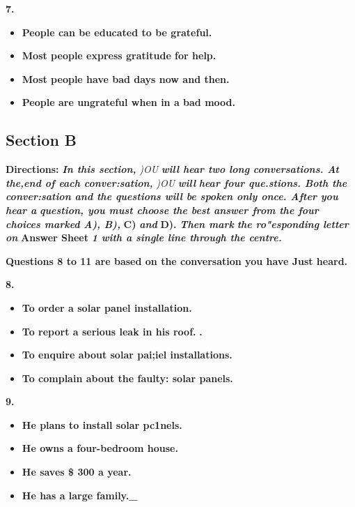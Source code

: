 \documentclass[UTF8,11pt]{ctexart}
\begin{document}
\textbf{7.}


\begin{itemize}[leftmargin=2em,itemsep=.2em,topsep=.4em]\item[A.] \textbf{People can be educated to be grateful.}
\item[B.] \textbf{Most people express gratitude for help.}
\item[C.] \textbf{Most people have bad days now and then.}
\item[D.] \textbf{People are ungrateful when in a bad mood.}
\end{itemize}

\subsection*{\textbf{Section B}}


\textbf{Directions: }\textbf{\textit{In this section, }}\textit{)OU }\textbf{\textit{will hear two long conversations. At the,end of each conver:sation, }}\textit{)OU }\textbf{\textit{will}} \textbf{\textit{hear four que.stions. Both the conver:sation and the questions will be spoken only once. After you hear a}} \textbf{\textit{question, you must choose the best answer from the four choices marked A), B), }}\textbf{C) }\textbf{\textit{and }}\textbf{D). }\textbf{\textit{Then mark}} \textbf{\textit{the ro"esponding letter on }}\textbf{Answer Sheet }\textbf{\textit{1 with a single line through the centre.}}


\textbf{Questions 8 to 11 are based on the conversation you have Just heard.}


\textbf{8.}


\begin{itemize}[leftmargin=2em,itemsep=.2em,topsep=.4em]\item[A.] \textbf{To order a solar panel installation.}
\item[B.] \textbf{To report a serious leak in his roof.} \textbf{.}
\item[C.] \textbf{To enquire about solar pai;iel installations.}
\item[D.] \textbf{To complain about the faulty: solar panels.}
\end{itemize}

\textbf{9.}


\begin{itemize}[leftmargin=2em,itemsep=.2em,topsep=.4em]\item[A.] \textbf{He plans to install solar pc1nels.}
\item[B.] \textbf{He owns a four-bedroom house.}
\item[C.] \textbf{He saves \$ 300 a year.}
\item[D.] \textbf{He has a large family.\_}
\end{itemize}
\end{document}
